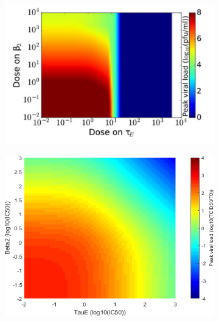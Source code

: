 \documentclass[a4paper,11pt]{article}
\begin{document}
\begin{figure}
\begin{subfigure}{0.4\textwidth}
    \includegraphics[width=\textwidth]{MBeta2TauEP.png}
    \end{subfigure}
    \begin{subfigure}{0.35\textwidth}
    
    \includegraphics[width=\textwidth]{Beta2TauE_peaks.png}
    \end{subfigure}
    
    \begin{subfigure}{0.4\textwidth}
    

\end{subfigure}
\end{figure}
\end{document}
